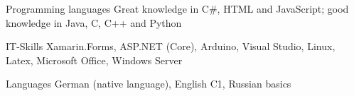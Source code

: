


\begin{cvskills}


\cvskill
{Programming languages} %
{Great knowledge in C\#, HTML and JavaScript; good knowledge in Java, C, C++ and Python} %


\cvskill
{IT-Skills} %
{Xamarin.Forms, ASP.NET (Core), Arduino, Visual Studio, Linux, Latex, Microsoft Office, Windows Server} %


\cvskill
{Languages} %
{German (native language), English C1, Russian basics} %


\end{cvskills}